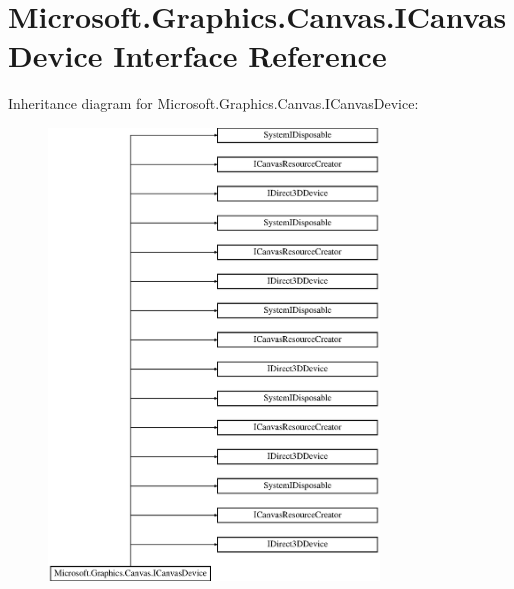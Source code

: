 \hypertarget{interface_microsoft_1_1_graphics_1_1_canvas_1_1_i_canvas_device}{}\section{Microsoft.\+Graphics.\+Canvas.\+I\+Canvas\+Device Interface Reference}
\label{interface_microsoft_1_1_graphics_1_1_canvas_1_1_i_canvas_device}
Inheritance diagram for Microsoft.\+Graphics.\+Canvas.\+I\+Canvas\+Device\+:\begin{figure}[H]
\begin{center}
\leavevmode
\includegraphics[height=12.000000cm]{interface_microsoft_1_1_graphics_1_1_canvas_1_1_i_canvas_device}
\end{center}
\end{figure}
